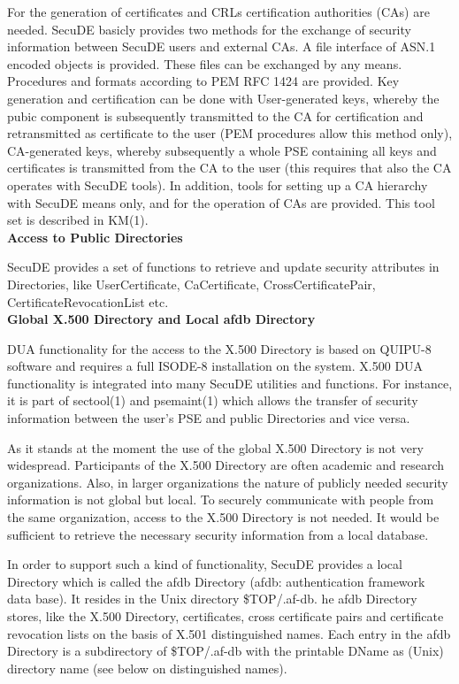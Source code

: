 For the generation of certificates and CRLs certification authorities 
(CAs) are needed.
SecuDE basicly provides two methods for the exchange of security
information between SecuDE users and external CAs.
\be
\m A file interface of ASN.1 encoded objects is provided. These
   files can be exchanged by any means.
\m Procedures and formats according to PEM RFC 1424 are provided.
\ee
Key generation and certification can be done with
\be
\m User-generated keys, whereby the pubic component is
   subsequently transmitted to the CA for certification and
   retransmitted as certificate to the user (PEM
   procedures allow this method only),
\m CA-generated keys, whereby subsequently a whole PSE
   containing all keys and certificates is transmitted from
   the CA to the user (this requires that also the CA operates
   with SecuDE tools).
\ee
In addition, tools for setting up a CA hierarchy with SecuDE means 
only, and for the operation of CAs are provided.
This tool set is described in KM(1).
\\ [1em]
{\large\bf Access to Public Directories}

SecuDE provides a set of functions to retrieve and update security 
attributes in Directories, like UserCertificate, CaCertificate, 
CrossCertificatePair, CertificateRevocationList etc.
\\ [1em]
{\bf Global X.500 Directory and Local afdb Directory}
 
DUA functionality for the access to the X.500 Directory is based on
QUIPU-8 software and requires a full ISODE-8 installation on the system. 
X.500 DUA functionality is integrated into many SecuDE utilities
and functions. For instance, it is part of sectool(1) and psemaint(1)
which allows the transfer of security information between the user's
PSE and public Directories and vice versa.

As it stands at the moment the use of the global X.500 Directory is not
very widespread. Participants of the X.500 Directory are often
academic and research organizations. Also, in larger organizations 
the nature of publicly needed security information is not global
but local. To securely communicate with people from the same organization,
access to the X.500 Directory is not needed. It would be sufficient
to retrieve the necessary security information from a local database.

In order to support such a kind of functionality, SecuDE provides a
local Directory which is called the afdb Directory (afdb: authentication
framework data base). It resides in the Unix directory \$TOP/.af-db.
he afdb Directory stores, like the X.500 Directory, certificates, 
cross certificate pairs and certificate revocation lists on the basis 
of X.501 distinguished names. Each entry in the afdb Directory is a 
subdirectory of \$TOP/.af-db with the printable DName as (Unix) directory 
name (see below on distinguished names).

